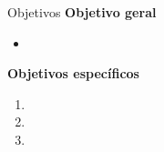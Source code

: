 \begin{frame}{Objetivos}
  \textbf{\color{peedark}Objetivo geral}
  \begin{itemize}
    \item {}
  \end{itemize}
  \vspace{0.6em}
  \textbf{\color{peedark}Objetivos específicos}
  \begin{enumerate}
    \item {}
    \item {}
    \item {}
  \end{enumerate}
\end{frame}

